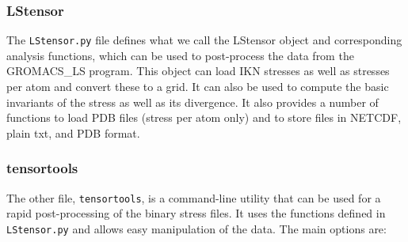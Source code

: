 \documentclass[10pt,letterpaper,notitlepage]{article}
\begin{document}
\subsubsection{LStensor}
The \texttt{LStensor.py} file defines what we call the LStensor object and corresponding analysis functions, which can be used to post-process the data from the GROMACS\_LS program. This object can load IKN stresses as well as stresses per atom and convert these to a grid. It can also be used to compute the basic invariants of the stress as well as its divergence. It also provides a number of functions to load PDB files (stress per atom only) and to store files in NETCDF, plain txt, and PDB format.

\subsubsection{tensortools}
The other file, \texttt{tensortools}, is a command-line utility that can be used for a rapid post-processing of the binary stress files. It uses the functions defined in \texttt{LStensor.py} and allows easy manipulation of the data. The main options are:
\end{document}
